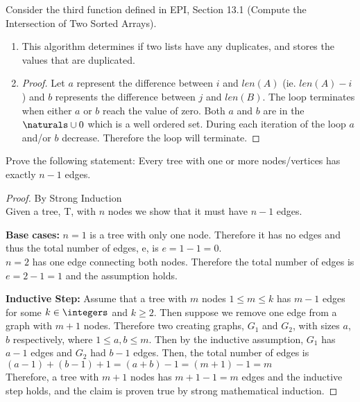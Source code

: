 \documentclass{article}
\author{Elliott Pryor}
\date{due: 6 September 2019}
\begin{document}
\nextprob
Consider the third function defined in EPI, Section 13.1 (Compute the
Intersection of Two Sorted Arrays).
\begin{enumerate}
\item This algorithm determines if two lists have any duplicates, and stores the values that are duplicated.
\item
\begin{proof}
Let $a$ represent the difference between $i$ and $len(A)$ (ie. $len(A) - i$) and $b$ represents the difference between $j$ and $len(B)$.
The loop terminates when either $a$ or $b$ reach the value of zero. Both $a$ and $b$ are in the $\naturals \cup 0$ which is a well ordered set.
During each iteration of the loop $a$ and/or $b$ decrease. Therefore the loop will terminate.
\end{proof}

\end{enumerate}

\nextprob
Prove the following statement: Every tree with one or more nodes/vertices has
exactly $n-1$ edges.

\begin{proof} By Strong Induction\\
Given a tree, T, with $n$ nodes we show that it must have $n-1$ edges.

\textbf{Base cases: } $n = 1$ is a tree with only one node. Therefore it has no edges and thus the total number of edges,
e, is $e = 1 - 1 = 0$.\\
$n = 2$ has one edge connecting both nodes. Therefore the total number of edges is $e = 2 - 1 = 1$ and the assumption holds.

\textbf{Inductive Step: } Assume that a tree with $m$ nodes $1 \leq m \leq k$ has $m - 1$ edges for some $k \in \integers$ and $k \geq 2$.
Then suppose we remove one edge from a graph with $m + 1$ nodes. Therefore two creating graphs,
$G_1$ and $G_2$, with sizes $a$, $b$ respectively, where $1 \leq a,b \leq m$. Then by the inductive assumption,
$G_1$ has $a-1$ edges and $G_2$ had $b-1$ edges. Then, the total number of edges is\\
$(a-1) + (b-1) + 1 = (a + b) - 1 = (m + 1) - 1 = m$\\
Therefore, a tree with $m + 1$ nodes has $m + 1 - 1 = m$ edges and the inductive step holds,
and the claim is proven true by strong mathematical induction.
\end{proof}
\end{document}
